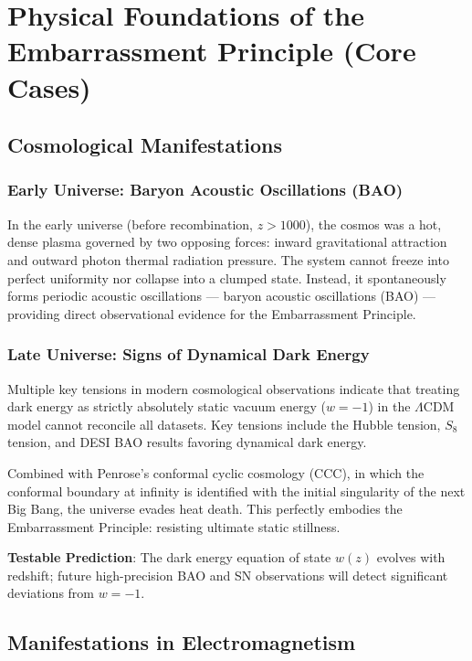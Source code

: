 \documentclass[10pt,a4paper]{article}
\begin{document}
\section{Physical Foundations of the Embarrassment Principle (Core Cases)}

\subsection{Cosmological Manifestations}

\subsubsection{Early Universe: Baryon Acoustic Oscillations (BAO)}
In the early universe (before recombination, $z>1000$), the cosmos was a hot, dense plasma governed by two opposing forces: inward gravitational attraction and outward photon thermal radiation pressure. The system cannot freeze into perfect uniformity nor collapse into a clumped state. Instead, it spontaneously forms periodic acoustic oscillations — baryon acoustic oscillations (BAO) — providing direct observational evidence for the Embarrassment Principle.

\subsubsection{Late Universe: Signs of Dynamical Dark Energy}
Multiple key tensions in modern cosmological observations indicate that treating dark energy as strictly absolutely static vacuum energy ($w=-1$) in the $\Lambda$CDM model cannot reconcile all datasets.
Key tensions include the Hubble tension, $S_8$ tension, and DESI BAO results favoring dynamical dark energy.

Combined with Penrose’s conformal cyclic cosmology (CCC), in which the conformal boundary at infinity is identified with the initial singularity of the next Big Bang, the universe evades heat death. This perfectly embodies the Embarrassment Principle: resisting ultimate static stillness.

\textbf{Testable Prediction}: The dark energy equation of state $w(z)$ evolves with redshift; future high-precision BAO and SN observations will detect significant deviations from $w=-1$.

\subsection{Manifestations in Electromagnetism}
\end{document}
